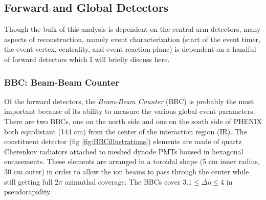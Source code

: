 \subsection{Forward and Global Detectors}
Though the bulk of this analysis is dependent on the central arm detectors, many aspects of reconstruction, namely event characterization (start of the event timer, the event vertex, centrality, and event reaction plane) is dependent on a handful of forward detectors which I will briefly discuss here.

\subsubsection{BBC: Beam-Beam Counter}
Of the forward detectors, the \textit{Beam-Beam Counter} (BBC) \citep{BBCfocus} is probably the most important because of its ability to measure the various global event parameters. There are two BBCs, one on the north side and one on the south side of PHENIX both equidistant (144 cm) from the center of the interaction region (IR). The constituent detector (fig \ref{fig:BBCillustrations}) elements are made of quartz Cherenkov radiators attached to meshed dynode PMTs housed in hexagonal encasements. These elements are arranged in a toroidal shape (5 cm inner radius, 30 cm outer) in order to allow the ion beams to pass through the center while still getting full $2\pi$ azimuthal coverage. The BBCs cover 3.1$\leq \Delta \eta \leq$4 in pseudorapidity. 
